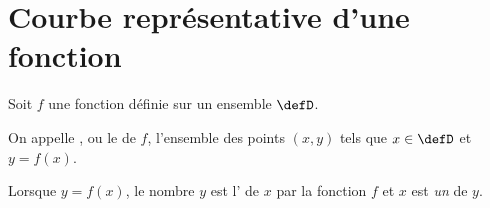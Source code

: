 
\section{Courbe représentative d'une fonction}


Soit $f$ une fonction définie sur un ensemble $\defD$.

\begin{definition}
    On appelle , ou le  de $f$, l'ensemble des points $(x,y)$ tels que $x\in\defD$ et $y=f(x)$.

    Lorsque \( y=f(x)\), le nombre \( y\) est l' de \( x\) par la fonction \( f\) et \( x\) est \emph{un}  de \( y\).
\end{definition}

